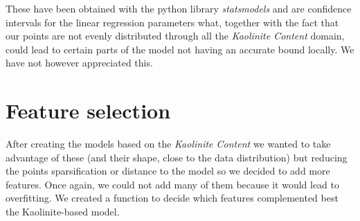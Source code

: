 \documentclass[10pt,conference,compsocconf]{IEEEtran}
\begin{document}
These have been obtained with the python library \textit{statsmodels} and are confidence intervals for the linear regression parameters what, together with the fact that our points are not evenly distributed through all the \textit{Kaolinite Content} domain, could lead to certain parts of the model not having an accurate bound locally. We have not however appreciated this.





\section{Feature selection}


After creating the models based on the \textit{Kaolinite Content} we wanted to take advantage of these (and their shape, close to the data distribution) but reducing the points sparsification or distance to the model so we decided to add more features. Once again, we could not add many of them because it would lead to overfitting. We created a function to decide which features complemented best the Kaolinite-based model.
\end{document}
